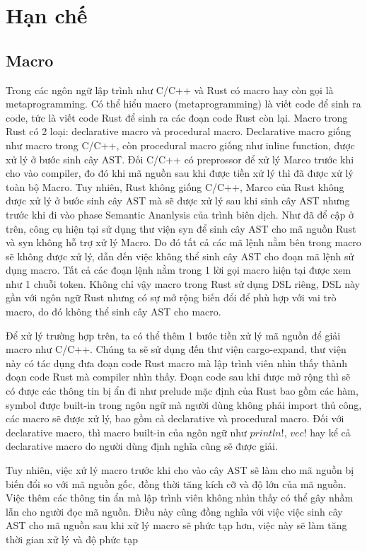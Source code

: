 \section{Hạn chế}

\subsection{Macro}

Trong các ngôn ngữ lập trình như C/C++ và Rust có macro hay còn gọi là metaprogramming. Có thể hiểu macro (metaprogramming) là viết code để sinh ra code, tức là viết code Rust để sinh ra các đoạn code Rust còn lại. Macro trong Rust có 2 loại: declarative macro và procedural macro. Declarative macro giống như macro trong C/C++, còn procedural macro giống như inline function, được xử lý ở bước sinh cây AST. Đối C/C++ có preprossor để xử lý Marco trước khi cho vào compiler, đo đó khi mã nguồn sau khi được tiền xử lý thì đã được xử lý toàn bộ Macro. Tuy nhiên, Rust không giống C/C++, Marco của Rust \cite{rustlangMacrosRust} không được xử lý ở bước sinh cây AST mà sẽ được xử lý sau khi sinh cây AST nhưng trước khi đi vào phase Semantic Ananlysis của trình biên dịch. Như đã để cập ở trên, công cụ hiện tại sử dụng thư viện syn để sinh cây AST cho mã nguồn Rust và syn không hỗ trợ xử lý Macro. Do đó tất cả các mã lệnh nằm bên trong macro sẽ không được xử lý, dẫn đến việc không thể sinh cây AST cho đoạn mã lệnh sử dụng macro. Tất cả các đoạn lệnh nằm trong 1 lời gọi macro hiện tại được xem như 1 chuỗi token. Không chỉ vậy macro trong Rust sử dụng DSL riêng, DSL này gần với ngôn ngữ Rust nhưng có sự mở rộng biến đổi để phù hợp với vai trò macro, do đó không thể sinh cây AST cho macro.

Để xử lý trường hợp trên, ta có thể thêm 1 bước tiền xử lý mã nguồn để giải macro như C/C++. Chúng ta sẽ sử dụng đến thư viện cargo-expand, thư viện này có tác dụng đưa đoạn code Rust macro mà lập trình viên nhìn thấy thành đoạn code Rust mà compiler nhìn thấy. Đoạn code sau khi được mở rộng thì sẽ có được các thông tin bị ẩn đi như prelude mặc định của Rust bao gồm các hàm, symbol được built-in trong ngôn ngữ mà người dùng không phải import thủ công, các macro sẽ được xử lý, bao gồm cả declarative và procedural macro. Đối với declarative macro, thì macro built-in của ngôn ngữ như $println!$, $vec!$ hay kể cả declarative macro do người dùng định nghĩa cũng sẽ được giải.

Tuy nhiên, việc xử lý macro trước khi cho vào cây AST sẽ làm cho mã nguồn bị biến đổi so với mã nguồn gốc, đồng thời tăng kích cỡ và độ lớn của mã nguồn. Việc thêm các thông tin ẩn mà lập trình viên không nhìn thấy có thể gây nhầm lẫn cho người đọc mã nguồn. Điều này cũng đồng nghĩa với việc việc sinh cây AST cho mã nguồn sau khi xử lý macro sẽ phức tạp hơn, việc này sẽ làm tăng thời gian xử lý và độ phức tạp

